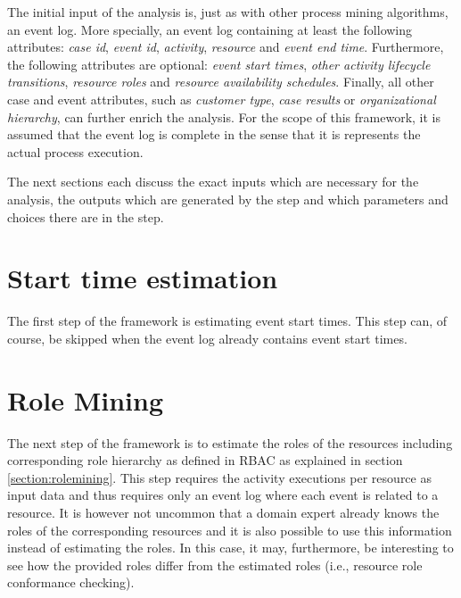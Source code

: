 The initial input of the analysis is, just as with other process mining algorithms, an event log. More specially, an event log containing at least the following attributes: \textit{case id}, \textit{event id}, \textit{activity}, \textit{resource} and \textit{event end time}. Furthermore, the following attributes are optional: \textit{event start times}, \textit{other activity lifecycle transitions}, \textit{resource roles} and \textit{resource availability schedules}. Finally, all other case and event attributes, such as \textit{customer type}, \textit{case results} or \textit{organizational hierarchy}, can further enrich the analysis. For the scope of this framework, it is assumed that the event log is complete in the sense that it is represents the actual process execution. 

The next sections each discuss the exact inputs which are necessary for the analysis, the outputs which are generated by the step and which parameters and choices there are in the step. 


\section{Start time estimation} 
The first step of the framework is estimating event start times. This step can, of course, be skipped when the event log already contains event start times. 



\section{Role Mining}
The next step of the framework is to estimate the roles of the resources including corresponding role hierarchy as defined in RBAC \cite{rbac2, rbac} as explained in section \ref{section:rolemining}. This step requires the activity executions per resource as input data and thus requires only an event log where each event is related to a resource. It is however not uncommon that a domain expert already knows the roles of the corresponding resources and it is also possible to use this information instead of estimating the roles. In this case, it may, furthermore, be interesting to see how the provided roles differ from the estimated roles (i.e., resource role conformance checking). 

